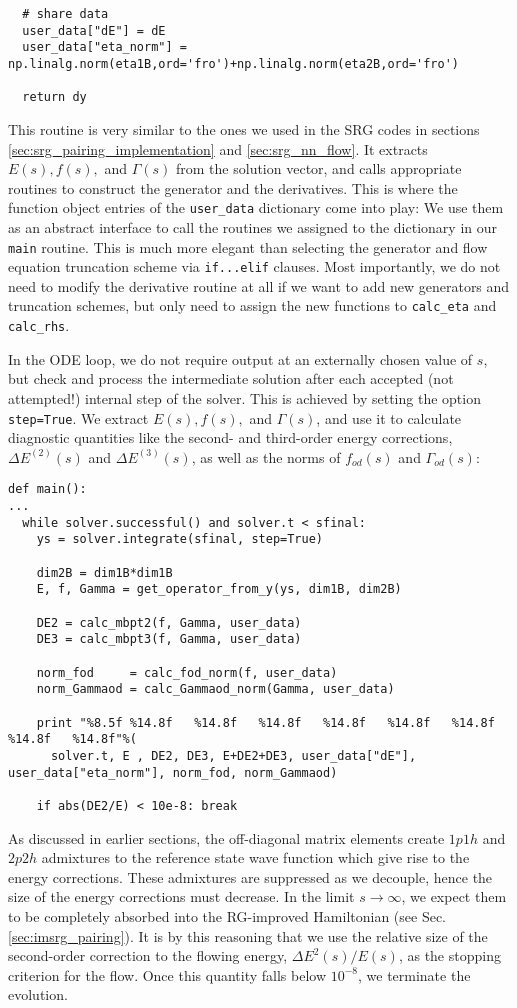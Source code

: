 {\begin{lstlisting}
  # share data
  user_data["dE"] = dE
  user_data["eta_norm"] = np.linalg.norm(eta1B,ord='fro')+np.linalg.norm(eta2B,ord='fro')
  
  return dy
\end{lstlisting}
This routine is very similar to the ones we used in the SRG
codes in sections \ref{sec:srg_pairing_implementation} and \ref{sec:srg_nn_flow}. It extracts
$E(s), f(s),$ and $\Gamma(s)$ from the solution vector, and calls 
appropriate routines to construct the generator and the derivatives.
This is where the function object entries of the \texttt{user\_data}
dictionary come into play: We use them as an abstract interface
to call the routines we assigned to the dictionary in our \texttt{main} 
routine. This is much more elegant than selecting the generator and
flow equation truncation scheme via \texttt{if...elif} clauses. Most 
importantly, we do not need to modify the derivative routine at all 
if we want to add new generators and truncation schemes, but only
need to assign the new functions to \texttt{calc\_eta} and 
\texttt{calc\_rhs}.

In the ODE loop, we do not require output at an externally chosen
value of $s$, but check and process the intermediate solution after
each accepted (not attempted!) internal step of the solver. This is
achieved by setting the option \texttt{step=True}. We extract 
$E(s), f(s),$ and $\Gamma(s)$, and use it to calculate diagnostic
quantities like the second- and third-order energy corrections, 
$\Delta E^{(2)}(s)$ and $\Delta E^{(3)}(s)$, as well as the norms 
of $f_{od}(s)$ and $\Gamma_{od}(s)$:  
\begin{lstlisting}
def main():
...
  while solver.successful() and solver.t < sfinal:
    ys = solver.integrate(sfinal, step=True)
    
    dim2B = dim1B*dim1B
    E, f, Gamma = get_operator_from_y(ys, dim1B, dim2B)

    DE2 = calc_mbpt2(f, Gamma, user_data)
    DE3 = calc_mbpt3(f, Gamma, user_data)

    norm_fod     = calc_fod_norm(f, user_data)
    norm_Gammaod = calc_Gammaod_norm(Gamma, user_data)

    print "%8.5f %14.8f   %14.8f   %14.8f   %14.8f   %14.8f   %14.8f   %14.8f   %14.8f"%(
      solver.t, E , DE2, DE3, E+DE2+DE3, user_data["dE"], user_data["eta_norm"], norm_fod, norm_Gammaod)

    if abs(DE2/E) < 10e-8: break

\end{lstlisting}
As discussed in earlier sections, the off-diagonal matrix elements 
create $1p1h$ and $2p2h$ admixtures to the reference state wave function 
which give rise to the energy corrections. These admixtures are suppressed
as we decouple, hence the size of the energy corrections must decrease.
In the limit $s\to\infty$, we expect them to be completely absorbed into
the RG-improved Hamiltonian (see Sec.\ref{sec:imsrg_pairing}). It is
by this reasoning that we use the relative size of the second-order correction
to the flowing energy, $\Delta E^2(s)/E(s)$, as the stopping criterion for
the flow. Once this quantity falls below $10^{-8}$, we terminate the evolution.

}
